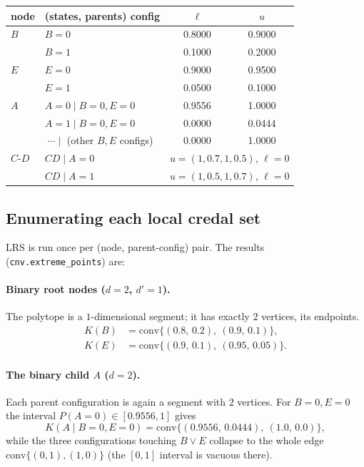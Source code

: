 \documentclass[11pt]{article}
\begin{document}
\begin{center}
\small
\begin{tabular}{llcc}
\toprule
node & (states, parents) config & $\ell$ & $u$ \\
\midrule
$B$ & $B{=}0$ & 0.8000 & 0.9000 \\
    & $B{=}1$ & 0.1000 & 0.2000 \\
\midrule
$E$ & $E{=}0$ & 0.9000 & 0.9500 \\
    & $E{=}1$ & 0.0500 & 0.1000 \\
\midrule
$A$ & $A{=}0 \mid B{=}0,E{=}0$ & 0.9556 & 1.0000 \\
    & $A{=}1 \mid B{=}0,E{=}0$ & 0.0000 & 0.0444 \\
    & $\;\cdots\mid$ (other $B,E$ configs) & 0.0000 & 1.0000 \\
\midrule
$C\text{-}D$ & $CD \mid A{=}0$ & \multicolumn{2}{c}{$u = (1,0.7,1,0.5)$, $\ell = 0$}\\
             & $CD \mid A{=}1$ & \multicolumn{2}{c}{$u = (1,0.5,1,0.7)$, $\ell = 0$}\\
\bottomrule
\end{tabular}
\end{center}

\subsection{Enumerating each local credal set}

LRS is run once per (node, parent-config) pair. The results
(\texttt{cnv.extreme\_points}) are:

\paragraph{Binary root nodes ($d=2$, $d'=1$).} The polytope is a $1$-dimensional
segment; it has exactly $2$ vertices, its endpoints.
\begin{align*}
  K(B) &= \mathrm{conv}\{(0.8,\,0.2),\ (0.9,\,0.1)\},\\
  K(E) &= \mathrm{conv}\{(0.9,\,0.1),\ (0.95,\,0.05)\}.
\end{align*}

\paragraph{The binary child $A$ ($d=2$).} Each parent configuration is again a segment
with $2$ vertices. For $B{=}0,E{=}0$ the interval $P(A{=}0) \in [0.9556, 1]$ gives
\[
  K(A \mid B{=}0,E{=}0) = \mathrm{conv}\{(0.9556,\,0.0444),\ (1.0,\,0.0)\},
\]
while the three configurations touching $B\vee E$ collapse to the whole edge
$\mathrm{conv}\{(0,1),(1,0)\}$ (the $[0,1]$ interval is vacuous there).
\end{document}
